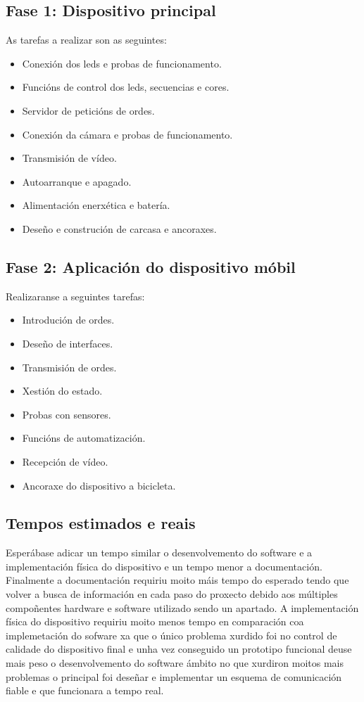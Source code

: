 \subsection{Fase 1: Dispositivo principal}
As tarefas a realizar son as seguintes:
\begin{itemize}
    \item Conexión dos leds e probas de funcionamento.
    \item Funcións de control dos leds, secuencias e cores.
    \item Servidor de peticións de ordes.
    \item Conexión da cámara e probas de funcionamento.
    \item Transmisión de vídeo.
    \item Autoarranque e apagado.
    \item Alimentación enerxética e batería.
    \item Deseño e construción de carcasa e ancoraxes.
\end{itemize}
\subsection{Fase 2: Aplicación do dispositivo móbil}
Realizaranse a seguintes tarefas:
\begin{itemize}

    \item Introdución de ordes.
    \item Deseño de interfaces.
    \item Transmisión de ordes.
    \item Xestión do estado.
    \item Probas con sensores.
    \item Funcións de automatización.
    \item Recepción de vídeo.
    \item Ancoraxe do dispositivo a bicicleta.
\end{itemize}

\subsection{Tempos estimados e reais}
Esperábase adicar un tempo similar o desenvolvemento do  software e a implementación física do dispositivo e un tempo menor a documentación. Finalmente a documentación requiriu moito máis tempo do esperado tendo que volver a busca de información en cada paso do proxecto debido aos múltiples compoñentes hardware e software utilizado sendo un apartado. A implementación física do dispositivo requiriu moito menos tempo en comparación coa implemetación do sofware xa que o único problema xurdido foi no control de calidade do dispositivo final e unha vez conseguido un prototipo funcional deuse mais peso o desenvolvemento do software ámbito no que xurdiron moitos mais problemas o principal foi deseñar e implementar un esquema de comunicación fiable e que funcionara a tempo real.

